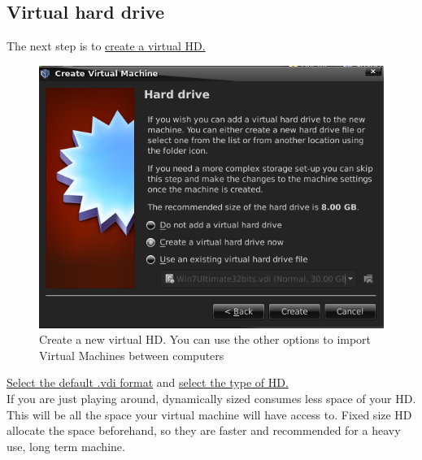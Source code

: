 \documentclass[a4paper]{article}
\begin{document}
\begin{figure}[H]
\begin{minipage}{0.5\linewidth}
{            \label{fig:VB_memory}}
    \end{minipage}
\end{figure}

\subsection{Virtual hard drive}
\noindent
The next step is to \hyperref[fig:VB_createHD]{create a virtual HD.}
\begin{figure}[H]
    \centering
    \includegraphics[width=0.5\linewidth]{VB_createHD.png}
    \caption{Create a new virtual HD. You can use the other options to import Virtual Machines between computers}
    \label{fig:VB_createHD}
\end{figure}

\noindent
\hyperref[fig:VB_createHD2]{Select the default .vdi format} and \hyperref[fig:VB_createHD3]{select the type of HD.}\\
\noindent
If you are just playing around, dynamically sized consumes less space of your HD.\\
This will be all the space your virtual machine will have access to. Fixed size HD allocate the space beforehand, so they are faster and recommended for a heavy use, long term machine.\\
\end{document}

